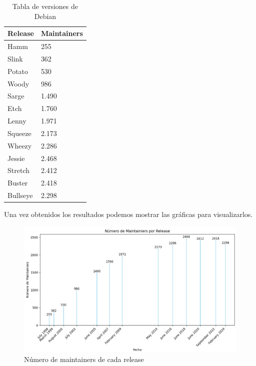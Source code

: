 \documentclass[a4paper, 12pt]{book}
\begin{document}
	\begin{table}[h]
		\begin{center}
			\begin{tabular}{|l|l|}
				\hline
				Release  & Maintainers \\ \hline
				Hamm     & 255         \\ \hline
				Slink    & 362         \\ \hline
				Potato   & 530         \\ \hline
				Woody    & 986         \\ \hline
				Sarge    & 1.490        \\ \hline
				Etch     & 1.760        \\ \hline
				Lenny    & 1.971        \\ \hline
				Squeeze  & 2.173        \\ \hline
				Wheezy   & 2.286        \\ \hline
				Jessie   & 2.468        \\ \hline
				Stretch  & 2.412        \\ \hline
				Buster   & 2.418        \\ \hline
				Bullseye & 2.298        \\ \hline
			\end{tabular}
			\caption{Tabla de versiones de Debian}
		\end{center}
	\end{table}


Una vez obtenidos los resultados podemos mostrar las gráficas para visualizarlos.
\begin{figure}
	\centering
	\includegraphics[width=15cm, keepaspectratio]{img/Figura2_buena_maintainers.png}
	\caption{Número de maintainers de cada release}
	\label{fig:mantenedores}
\end{figure}
\end{document}
